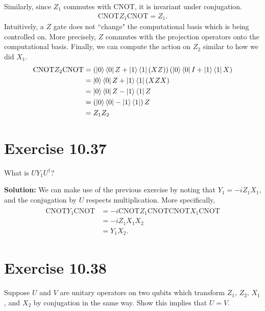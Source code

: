 \documentclass{book}
\begin{document}
    Similarly, since $Z_1$ commutes with $\mathrm{CNOT}$, it is invariant under conjugation.
    \begin{align}
        \mathrm{CNOT} Z_1 \mathrm{CNOT} = Z_1.
    \end{align}
    Intuitively, a $Z$ gate does not ``change" the computational basis which is being controlled on. More precisely, $Z$ commutes with the projection operators onto the computational basis. Finally, we can compute the action on $Z_2$ similar to how we did $X_1$.
    \begin{align}
    \begin{aligned}
        \mathrm{CNOT} Z_2 \mathrm{CNOT} &= \left(\ket{0}\bra{0}Z + \ket{1}\bra{1}(XZ)\right)\left(\ket{0}\bra{0}I + \ket{1}\bra{1}X\right) \\
        &= \ket{0}\bra{0}Z + \ket{1}\bra{1}(XZX) \\
        &= \ket{0}\bra{0}Z -\ket{1}\bra{1}Z \\
        &= \left(\ket{0}\bra{0}-\ket{1}\bra{1}\right) Z \\
        &= Z_1 Z_2
    \end{aligned}
    \end{align}
    
\section*{Exercise 10.37}
    What is $U Y_1 U^{\dagger}$?
    
    \textbf{Solution:} We can make use of the previous exercise by noting that $Y_1 = -i Z_1 X_1$, and the conjugation by $U$ respects multiplication. More specifically,
    \begin{align}
    \begin{aligned}
        \mathrm{CNOT}Y_1 \mathrm{CNOT} &= -i \mathrm{CNOT}Z_1 \mathrm{CNOT} \mathrm{CNOT} X_1 \mathrm{CNOT} \\
        &=-i Z_1 X_1 X_2 \\
        &=Y_1 X_2.
    \end{aligned}
    \end{align}
    
\section*{Exercise 10.38}
    Suppose $U$ and $V$ are unitary operators on two qubits which transform $Z_1$, $Z_2$, $X_1$, and $X_2$ by conjugation in the same way. Show this implies that $U = V$.
    
\end{document}
